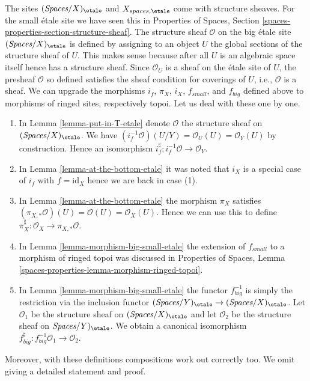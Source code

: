 \begin{remark}
\label{remark-change-topologies-ringed}
The sites $(\textit{Spaces}/X)_\etale$ and $X_{spaces, \etale}$
come with structure sheaves. For the small \'etale site we
have seen this in Properties of Spaces, Section
\ref{spaces-properties-section-structure-sheaf}.
The structure sheaf $\mathcal{O}$ on the big \'etale site
$(\textit{Spaces}/X)_\etale$ is defined by assigning to an object
$U$ the global sections of the structure sheaf of $U$.
This makes sense because after all $U$ is an algebraic space
itself hence has a structure sheaf. Since $\mathcal{O}_U$
is a sheaf on the \'etale site of $U$, the presheaf $\mathcal{O}$
so defined satisfies the sheaf condition for coverings of $U$, i.e.,
$\mathcal{O}$ is a sheaf.
We can upgrade the morphisms $i_f$, $\pi_X$, $i_X$, $f_{small}$, and
$f_{big}$ defined above to morphisms of ringed sites, respectively topoi.
Let us deal with these one by one.
\begin{enumerate}
\item In Lemma \ref{lemma-put-in-T-etale} denote $\mathcal{O}$
the structure sheaf on $(\textit{Spaces}/X)_\etale$.
We have $(i_f^{-1}\mathcal{O})(U/Y) = \mathcal{O}_U(U) = \mathcal{O}_Y(U)$
by construction.
Hence an isomorphism $i_f^\sharp ; i_f^{-1}\mathcal{O} \to \mathcal{O}_Y$.
\item In Lemma \ref{lemma-at-the-bottom-etale} it was noted
that $i_X$ is a special case of $i_f$ with $f = \text{id}_X$
hence we are back in case (1).
\item In Lemma \ref{lemma-at-the-bottom-etale} the morphism
$\pi_X$ satisfies $(\pi_{X, *}\mathcal{O})(U) = \mathcal{O}(U) =
\mathcal{O}_X(U)$. Hence we can use this to define
$\pi_X^\sharp : \mathcal{O}_X \to \pi_{X, *}\mathcal{O}$.
\item In Lemma \ref{lemma-morphism-big-small-etale}
the extension of $f_{small}$ to a morphism of ringed topoi
was discussed in Properties of Spaces, Lemma
\ref{spaces-properties-lemma-morphism-ringed-topoi}.
\item In Lemma \ref{lemma-morphism-big-small-etale}
the functor $f_{big}^{-1}$ is simply the restriction
via the inclusion functor
$(\textit{Spaces}/Y)_\etale \to (\textit{Spaces}/X)_\etale$.
Let $\mathcal{O}_1$ be the structure sheaf on $(\textit{Spaces}/X)_\etale$
and let $\mathcal{O}_2$ be the structure sheaf on $\textit{Spaces}/Y)_\etale$.
We obtain a canonical isomorphism
$f_{big}^\sharp : f_{big}^{-1}\mathcal{O}_1 \to \mathcal{O}_2$.
\end{enumerate}
Moreover, with these definitions compositions work out correctly too.
We omit giving a detailed statement and proof.
\end{remark}









